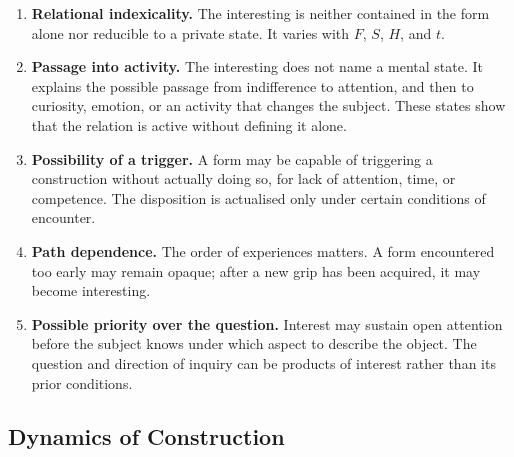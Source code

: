 \documentclass[11pt,a4paper]{article}
\begin{document}
\begin{enumerate}
  \item \textbf{Relational indexicality.} The interesting is neither contained
        in the form alone nor reducible to a private state. It varies with
        \(F\), \(S\), \(H\), and \(t\).
  \item \textbf{Passage into activity.} The interesting does not name a mental
        state. It explains the possible passage from indifference to attention,
        and then to curiosity, emotion, or an activity that changes the subject.
        These states show that the relation is active without defining it alone.
  \item \textbf{Possibility of a trigger.} A form may be capable of triggering a
        construction without actually doing so, for lack of attention, time, or
        competence. The disposition is actualised only under certain conditions
        of encounter.
  \item \textbf{Path dependence.} The order of experiences matters. A form
        encountered too early may remain opaque; after a new grip has been
        acquired, it may become interesting.
  \item \textbf{Possible priority over the question.} Interest may sustain
        open attention before the subject knows under which aspect to describe
        the object. The question and direction of inquiry can be products of
        interest rather than its prior conditions.
\end{enumerate}

\subsection{Dynamics of Construction}
\end{document}
